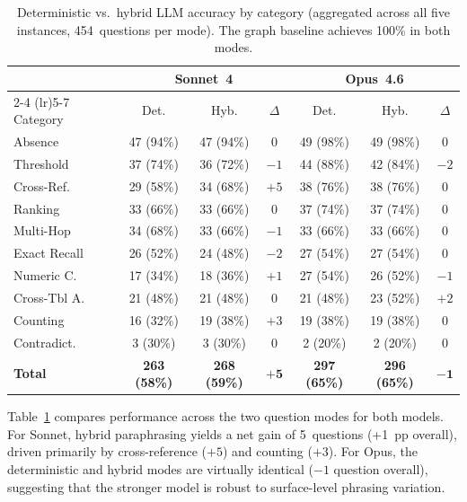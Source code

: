 \documentclass[11pt]{article}
\begin{document}
\begin{table}[t]
\centering
\caption{Deterministic vs.\ hybrid LLM accuracy by category (aggregated
across all five instances, 454~questions per mode).  The graph baseline
achieves 100\% in both modes.}
\label{tab:det_vs_hybrid}
\small
\begin{tabular}{lcccccc}
\toprule
& \multicolumn{3}{c}{Sonnet~4} & \multicolumn{3}{c}{Opus~4.6} \\
\cmidrule(lr){2-4} \cmidrule(lr){5-7}
Category & Det. & Hyb. & $\Delta$ & Det. & Hyb. & $\Delta$ \\
\midrule
Absence & 47 (94\%) & 47 (94\%) & $0$ & 49 (98\%) & 49 (98\%) & $0$ \\
Threshold & 37 (74\%) & 36 (72\%) & $-1$ & 44 (88\%) & 42 (84\%) & $-2$ \\
Cross-Ref. & 29 (58\%) & 34 (68\%) & $+5$ & 38 (76\%) & 38 (76\%) & $0$ \\
Ranking & 33 (66\%) & 33 (66\%) & $0$ & 37 (74\%) & 37 (74\%) & $0$ \\
Multi-Hop & 34 (68\%) & 33 (66\%) & $-1$ & 33 (66\%) & 33 (66\%) & $0$ \\
Exact Recall & 26 (52\%) & 24 (48\%) & $-2$ & 27 (54\%) & 27 (54\%) & $0$ \\
Numeric C. & 17 (34\%) & 18 (36\%) & $+1$ & 27 (54\%) & 26 (52\%) & $-1$ \\
Cross-Tbl A. & 21 (48\%) & 21 (48\%) & $0$ & 21 (48\%) & 23 (52\%) & $+2$ \\
Counting & 16 (32\%) & 19 (38\%) & $+3$ & 19 (38\%) & 19 (38\%) & $0$ \\
Contradict. & 3 (30\%) & 3 (30\%) & $0$ & 2 (20\%) & 2 (20\%) & $0$ \\
\midrule
\textbf{Total} & \textbf{263 (58\%)} & \textbf{268 (59\%)} & $\mathbf{+5}$ & \textbf{297 (65\%)} & \textbf{296 (65\%)} & $\mathbf{-1}$ \\
\bottomrule
\end{tabular}
\end{table}

Table~\ref{tab:det_vs_hybrid} compares performance across the two
question modes for both models.  For Sonnet, hybrid paraphrasing yields
a net gain of 5~questions (+1~pp overall), driven primarily by
cross-reference ($+5$) and counting ($+3$).  For Opus, the deterministic
and hybrid modes are virtually identical ($-1$ question overall),
suggesting that the stronger model is robust to surface-level phrasing
variation.
\end{document}
